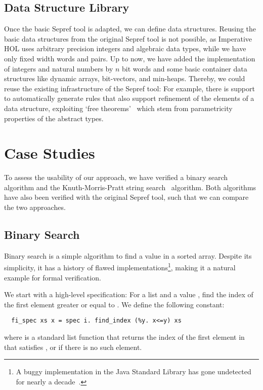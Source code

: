 \documentclass[a4paper,USenglish,cleveref, autoref]{lipics-v2019}
\begin{document}
\subsection{Data Structure Library}
Once the basic Sepref tool is adapted, we can define data structures. 
Reusing the basic data structures from the original Sepref tool is not possible, as Imperative HOL 
uses arbitrary precision integers and algebraic data types, while we have only fixed width words and pairs.
Up to now, we have added the implementation of integers and natural numbers 
by $n$ bit words and some basic container data structures like dynamic arrays, bit-vectors, and min-heaps.
Thereby, we could reuse the existing infrastructure of the Sepref tool: For example,
there is support to automatically generate rules that also support refinement of the elements of a data structure, 
exploiting `free theorems'~\cite{Wad89} which stem from parametricity properties of the abstract types.

\section{Case Studies}\label{sec:casestudies}
To assess the usability of our approach, we have verified a binary search algorithm and 
the Knuth-Morris-Pratt string search~\cite{KMP77} algorithm. 
Both algorithms have also been verified with the original Sepref tool, such that we can compare the two approaches.

\subsection{Binary Search}
Binary search is a simple algorithm to find a value in a sorted array. 
Despite its simplicity, it has a history of flawed implementations\footnote{A buggy implementation in the Java Standard Library has gone undetected for nearly a decade~\cite{bs_flaw_blogpost}.}, making it a natural example for formal verification.

We start with a high-level specification: For a list  and a value , find the index of the first element greater or equal to .
We define the following constant:
\begin{lstlisting}
  fi_spec xs x = spec i. find_index (%y. x<=y) xs
\end{lstlisting}
where  is a standard list function that returns the index of the 
first element in  that satisfies , or  if there is no such element.
\end{document}
